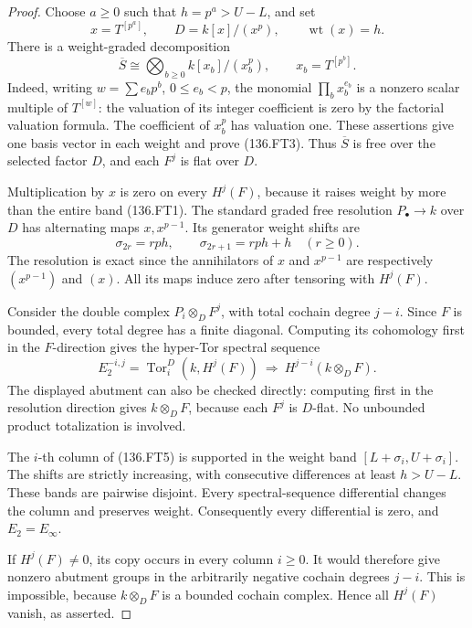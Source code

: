 \begin{proof}
Choose \(a\geq0\) such that \(h=p^a>U-L\), and set
\[
 x=T^{[p^a]},\qquad D=k[x]/(x^p),\qquad\operatorname{wt}(x)=h.
                                                        \tag{136.FT2}
\]
There is a weight-graded decomposition
\[
 \overline S\cong\bigotimes_{b\geq0}
          k[x_b]/(x_b^p),\qquad x_b=T^{[p^b]}.
                                                        \tag{136.FT3}
\]
Indeed, writing \(w=\sum e_bp^b\), \(0\leq e_b<p\), the
monomial \(\prod_b x_b^{e_b}\) is a nonzero scalar multiple of
\(T^{[w]}\): the valuation of its integer coefficient is zero
by the factorial valuation formula. The coefficient of \(x_b^p\)
has valuation one. These assertions give one basis vector in each
weight and prove (136.FT3). Thus \(\overline S\) is free over
the selected factor \(D\), and each \(F^j\) is flat over \(D\).

Multiplication by \(x\) is zero on every \(H^j(F)\), because it
raises weight by more than the entire band (136.FT1). The standard
graded free resolution \(P_\bullet\to k\) over \(D\) has alternating
maps \(x,x^{p-1}\). Its generator weight shifts are
\[
 \sigma_{2r}=rph,\qquad \sigma_{2r+1}=rph+h
                    \quad(r\geq0).                    \tag{136.FT4}
\]
The resolution is exact since the annihilators of \(x\) and
\(x^{p-1}\) are respectively \((x^{p-1})\) and \((x)\).
All its maps induce zero after tensoring with \(H^j(F)\).

Consider the double complex \(P_i\otimes_D F^j\), with total
cochain degree \(j-i\). Since \(F\) is bounded, every total
degree has a finite diagonal. Computing its cohomology first in
the \(F\)-direction gives the hyper-Tor spectral sequence
\[
 E_2^{-i,j}=\operatorname{Tor}_i^D(k,H^j(F))
   \ \Longrightarrow\ H^{j-i}(k\otimes_D F).
                                                        \tag{136.FT5}
\]
The displayed abutment can also be checked directly: computing first
in the resolution direction gives \(k\otimes_D F\), because each
\(F^j\) is \(D\)-flat. No unbounded product totalization is involved.

The \(i\)-th column of (136.FT5) is supported in the weight band
\([L+\sigma_i,U+\sigma_i]\). The shifts are strictly increasing,
with consecutive differences at least \(h>U-L\). These bands are
pairwise disjoint. Every spectral-sequence differential changes the
column and preserves weight. Consequently every differential is zero,
and \(E_2=E_\infty\).

If \(H^j(F)\neq0\), its copy occurs in every column \(i\geq0\).
It would therefore give nonzero abutment groups in the arbitrarily
negative cochain degrees \(j-i\). This is impossible, because
\(k\otimes_D F\) is a bounded cochain complex. Hence all
\(H^j(F)\) vanish, as asserted.
\end{proof}

